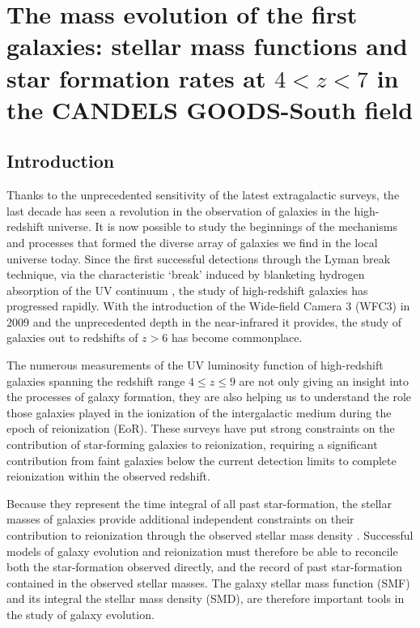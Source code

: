 \chapter[The mass evolution of the first galaxies]{The mass evolution of the first galaxies: stellar mass functions and star formation rates at $4 < z < 7$ in the CANDELS GOODS-South field}\label{ch:smf}

\section{Introduction}
Thanks to the unprecedented sensitivity of the latest extragalactic surveys, the last decade has seen a revolution in the observation of galaxies in the high-redshift universe. It is now possible to study the beginnings of the mechanisms and processes that formed the diverse array of galaxies we find in the local universe today. Since the first successful detections through the Lyman break technique, via the characteristic `break' induced by blanketing hydrogen absorption of the UV continuum \citep{1990ApJ...357L...9G, 1992AJ....104..941S}, the study of high-redshift galaxies has progressed rapidly. With the introduction of the Wide-field Camera 3 (WFC3) in 2009 and the unprecedented depth in the near-infrared it provides, the study of galaxies out to redshifts of $z > 6$ has become commonplace. 

The numerous measurements of the UV luminosity function of high-redshift galaxies spanning the redshift range $4 \leq z \leq 9$ \citep{2007ApJ...670..928B,2009MNRAS.395.2196M,Oesch:2009ew,Bouwens:2010dk,2011A&A...532A..33G,Lorenzoni:2011iz,McLure:2013hh,Schenker:2013cl} are not only giving an insight into the processes of galaxy formation, they are also helping us to understand the role those galaxies played in the ionization of the intergalactic medium during the epoch of reionization (EoR). These surveys have put strong constraints on the contribution of star-forming galaxies to reionization, requiring a significant contribution from faint galaxies below the current detection limits to complete reionization within the observed redshift.

Because they represent the time integral of all past star-formation, the stellar masses of galaxies provide additional independent constraints on their contribution to reionization through the observed stellar mass density \citep{2010Natur.468...49R}. Successful models of galaxy evolution and reionization must therefore be able to reconcile both the star-formation observed directly, and the record of past star-formation contained in the observed stellar masses. The galaxy stellar mass function (SMF) and its integral the stellar mass density (SMD), are therefore  important tools in the study of galaxy evolution.

